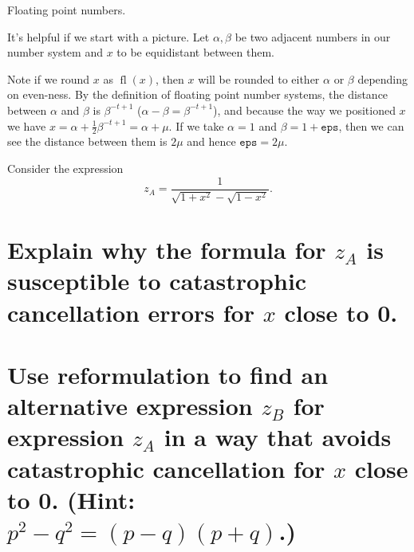 \documentclass[boxes,pages]{homework}
\DeclareMathOperator{\fl}{fl}
\begin{document}
\begin{problem}
Floating point numbers.
\end{problem}

\begin{solution}
	It's helpful if we start with a picture. Let $\alpha, \beta$ be two adjacent numbers in our number system and $x$ to be equidistant between them.
	\begin{center}
	\end{center}
	Note if we round $x$ as $\fl(x)$, then $x$ will be rounded to either $\alpha$ or $\beta$ depending on even-ness. By the definition of floating point number systems, the distance between $\alpha$ and $\beta$ is $\beta^{-t + 1}$ ($\alpha - \beta = \beta^{-t + 1}$), and because the way we positioned $x$ we have $x = \alpha + \frac{1}{2}\beta^{-t + 1} = \alpha + \mu$. If we take $\alpha = 1$ and $\beta = 1 + \texttt{eps}$, then we can see the distance between them is $2\mu$ and hence $\texttt{eps} = 2\mu$.
\end{solution}

\begin{problem}
Consider the expression
\[
	z_A = \frac{1}{\sqrt{1 + x^2} - \sqrt{1 - x^2}}.
\]
\begin{parts}
	\part{Explain why the formula for $z_A$ is susceptible to catastrophic cancellation errors for $x$ close to 0.}\label{part:2a}
	\part{Use reformulation to find an alternative expression $z_B$ for expression $z_A$ in a way that avoids catastrophic cancellation for $x$ close to 0. (Hint: $p^2 - q^2 = (p - q)(p + q)$.)}\label{part:2b}
\end{parts}
\end{problem}
\end{document}
